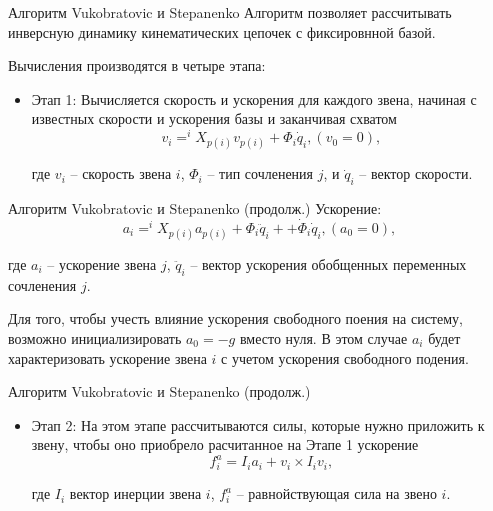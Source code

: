 \documentclass[newPxFont,numfooter,sectionpages]{beamer}
\begin{document}
\begin{frame}{Алгоритм Vukobratovic и Stepanenko}
	Алгоритм позволяет рассчитывать инверсную динамику кинематических цепочек с фиксировнной базой.
	
	Вычисления производятся в четыре этапа:
	\begin{itemize}
		\item Этап 1:
		Вычисляется скорость и ускорения для каждого звена, начиная с известных скорости и ускорения базы и заканчивая схватом
		\begin{equation*}
		v_i = ^iX_{p(i)} v_{p(i)} + \Phi_i \dot q_i, (v_0 = 0),
		\end{equation*}
		
		где $v_i$ -- скорость звена $i$, $\Phi_i$ -- тип сочленения $j$, и $\dot q_i$ -- вектор скорости.
		
		\end{itemize}	

\end{frame}
\begin{frame}{Алгоритм Vukobratovic и Stepanenko (продолж.)}
		Ускорение:
		\begin{equation*}
		a_i = ^iX_{p(i)} a_{p(i)} + \Phi_i \ddot q_i ++ \dot\Phi_i \dot q_i, (a_0 = 0), 
		\end{equation*}
		
		где $a_i$ -- ускорение звена $j$, $\ddot q_i$ -- вектор ускорения обобщенных переменных сочленения $j$.
		
		Для того, чтобы учесть влияние ускорения свободного поения на систему, возможно инициализировать $a_0 = -g$ вместо нуля. В этом случае $a_i$ будет характеризовать ускорение звена $i$ с учетом ускорения свободного подения.
	
\end{frame}
\begin{frame}{Алгоритм Vukobratovic и Stepanenko (продолж.)}
		\begin{itemize}
		\item Этап 2:
На этом этапе рассчитываются силы, которые нужно приложить к звену, чтобы оно приобрело расчитанное на Этапе 1 ускорение
\begin{equation*}
f^a_i = I_i a_i + v_i \times I_i v_i,
\end{equation*}

где $I_i$ вектор инерции звена $i$, $f^a_i$ -- равнойствующая сила на звено $i$.

\end{itemize}
\end{frame}
\end{document}

